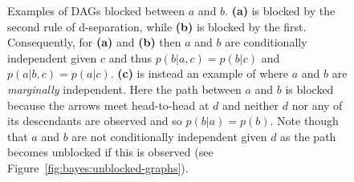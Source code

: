 \begin{figure}[t]
	\centering 
	\begin{subfigure}[t]{0.32\textwidth}
		\centering
		\resizebox{0.9\textwidth}{!}{
		}
		\caption{\label{fig:bayes:block1}}
	\end{subfigure}
	\begin{subfigure}[t]{0.32\textwidth}
		\centering
		\resizebox{0.9\textwidth}{!}{
		}
		\caption{\label{fig:bayes:block2}}
	\end{subfigure}
	\begin{subfigure}[t]{0.32\textwidth}
		\centering
		\resizebox{0.9\textwidth}{!}{
		}
		\caption{\label{fig:bayes:block3}}
	\end{subfigure}
	\caption{Examples of DAGs blocked between $a$ and $b$.  \textbf{(a)} is blocked
		by the second rule of d-separation, while
		\textbf{(b)} is blocked by the first.  Consequently, for \textbf{(a)} 
		and \textbf{(b)} then $a$ and $b$ are conditionally independent given $c$ and thus
		$p(b|a,c)=p(b|c)$ and $p(a|b,c)=p(a|c)$.
		\textbf{(c)} is instead an example of where $a$ and $b$ are \emph{marginally} independent.  Here
		the path between $a$ and $b$ is blocked because the arrows meet head-to-head at 
		$d$ and neither $d$ nor any of its
		descendants are observed and so $p(b|a) = p(b)$.
		Note though that $a$ and $b$ are not conditionally independent given $d$ as
		the path becomes unblocked if this is observed (see Figure~\ref{fig:bayes:unblocked-graphs}).
		\label{fig:bayes:blocked-graphs}
		\vspace{5pt}}
\end{figure}

